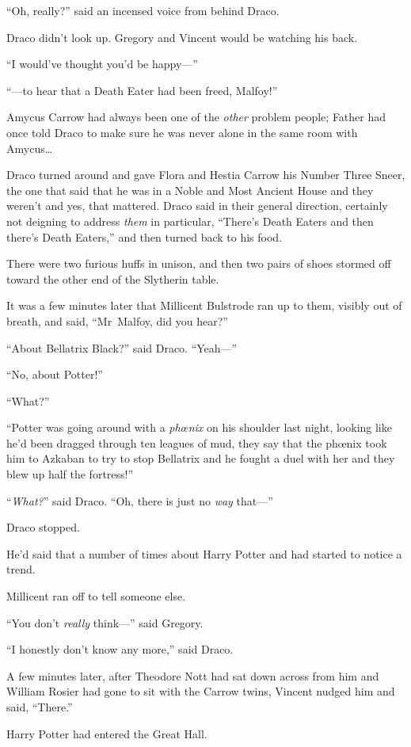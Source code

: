 “Oh, really?” said an incensed voice from behind Draco.

Draco didn’t look up. Gregory and Vincent would be watching his back.

“I would’ve thought you’d be happy—”

“—to hear that a Death Eater had been freed, Malfoy!”

Amycus Carrow had always been one of the \emph{other} problem people; Father had once told Draco to make sure he was never alone in the same room with Amycus…

Draco turned around and gave Flora and Hestia Carrow his Number Three Sneer, the one that said that he was in a Noble and Most Ancient House and they weren’t and yes, that mattered. Draco said in their general direction, certainly not deigning to address \emph{them} in particular, “There’s Death Eaters and then there’s Death Eaters,” and then turned back to his food.

There were two furious huffs in unison, and then two pairs of shoes stormed off toward the other end of the Slytherin table.

It was a few minutes later that Millicent Bulstrode ran up to them, visibly out of breath, and said, “Mr~Malfoy, did you hear?”

“About Bellatrix Black?” said Draco. “Yeah—”

“No, about Potter!”

“What?”

“Potter was going around with a \emph{phœnix} on his shoulder last night, looking like he’d been dragged through ten leagues of mud, they say that the phœnix took him to Azkaban to try to stop Bellatrix and he fought a duel with her and they blew up half the fortress!”

“\emph{What?}” said Draco. “Oh, there is just no \emph{way} that—”

Draco stopped.

He’d said that a number of times about Harry Potter and had started to notice a trend.

Millicent ran off to tell someone else.

“You don’t \emph{really} think—” said Gregory.

“I honestly don’t know any more,” said Draco.

A few minutes later, after Theodore Nott had sat down across from him and William Rosier had gone to sit with the Carrow twins, Vincent nudged him and said, “There.”

Harry Potter had entered the Great Hall.

